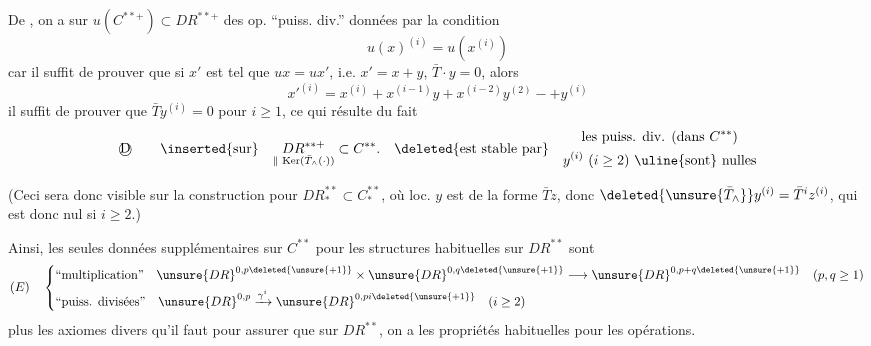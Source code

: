 De , on a sur $u(C^{**+})\subset DR^{**+}$ des op.
``puiss. div.''  données par la condition
\[
u(x)^{(i)}=u(x^{(i)})
\]
car il suffit de prouver que si $x'$ est tel que
$ux=ux'$, i.e. $x'=x+y$, $\bar T\cdot y=0$, alors
\[
x'^{(i)}=x^{(i)}+x^{(i-1)}y+x^{(i-2)}y^{(2)}-+y^{(i)}
\]
il suffit de prouver que $\bar T y^{(i)}=0$ pour $i\geq1$,
ce qui résulte du fait 
\[
\text{\textcircled{D}}\qquad
\inserted{\text{sur}}\quad
\underset{\Vert\,\operatorname{Ker}(\bar T_\wedge(\cdot))}{DR^{**+}}\subset C^{**}.
\quad\deleted{\text{est stable par}}
\quad\begin{gathered}
\text{les puiss. div. (dans }C^{**}\text{)}\\
y^{(i)}\ (i\geq2)\ \text{\uline{sont} nulles}
\end{gathered}
\]

(Ceci sera donc visible sur la construction pour $DR_*^{**}\subset C_*^{**}$,
où loc. $y$ est de la forme $\bar Tz$, donc
$\deleted{\unsure{\bar T_\wedge}}y^{(i)}=\bar T^i z^{(i)}$,
qui est donc nul si $i\geq2$.)


Ainsi, les seules données supplémentaires sur $C^{**}$ pour
 les structures habituelles sur $DR^{**}$ sont
\[
(E)\quad\left\{\begin{aligned}
&\text{``multiplication''}\quad
\unsure{DR}^{0,p\deleted{\unsure{+1}}}\times
\unsure{DR}^{0,q\deleted{\unsure{+1}}}\longrightarrow
\unsure{DR}^{0,p+q\deleted{\unsure{+1}}}
\quad(p,q\geq1)\\
&\text{``puiss. divisées''}\quad
\unsure{DR}^{0,p}\xrightarrow{\gamma^i}
\unsure{DR}^{0,pi\deleted{\unsure{+1}}}
\quad(i\geq2)
\end{aligned}\right.
\]
plus les axiomes divers qu'il faut pour assurer que sur $DR^{**}$, on a les propriétés habituelles pour les opérations.

